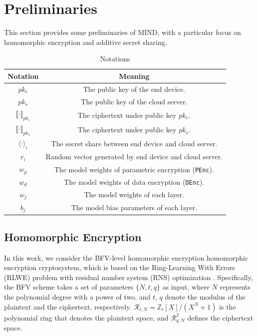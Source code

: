 ﻿\documentclass[conference]{IEEEtran}
\newcommand{\DEnc}{\texttt{DEnc}}
\newcommand{\PEnc}{\texttt{PEnc}}
\providecommand{\DIFaddend}{} %
\DeclareRobustCommand{\DIFaddend}{\DIFOaddend \let\includegraphics\DIFOincludegraphics} %
\begin{document}
\DIFaddend \section{Preliminaries}
This section provides some preliminaries of MIND, with a particular focus on homomorphic encryption and additive secret sharing.
\begin{table}[h]
\centering
\caption{Notations}
\label{table:notations}
\begin{tabular}{cc}
\toprule
\textbf{Notation} & \textbf{Meaning} \\ \midrule
$pk_e$                                   & The public key of the end device. \\
$pk_s$                                   & The public key of the cloud server. \\
$\llbracket \cdot \rrbracket_{pk_e}$     & The ciphertext under public key $pk_e$. \\
$\llbracket \cdot \rrbracket_{pk_s}$     & The ciphertext under public key $pk_s$. \\
$\langle \cdot \rangle_i$                & The secret share between end device and cloud server. \\
$r_i$                                    & Random vector generated by end device and cloud server. \\
$w_p$                                    & The model weights of parametric encryption (\PEnc).\\
$w_d$                                    & The model weights of data encryption (\DEnc).\\
$w_j$                                      & The model weights of each layer. \\
$b_j$                                      & The model bias parameters of each layer. \\

\bottomrule
\end{tabular}
\end{table}

\subsection{Homomorphic Encryption}\label{HE}
In this work, we consider the BFV-level homomorphic encryption homomorphic encryption cryptosystem, which is based on the Ring-Learning With Errors (RLWE) problem with residual number system (RNS) optimization \cite{bajard2016full}. Specifically, the BFV scheme takes a set of parameters $\{N, t, q\}$ as input, where $N$ represents the polynomial degree with a power of two, and $t$, $q$ denote the modulus of the plaintext and the ciphertext, respectively. $\mathcal{R}_{t,N} = \mathbb{Z}_t [X]/(X^N + 1)$ is the polynomial ring that denotes the plaintext space, and $\mathcal{R}_{q, N}^2$ defines the ciphertext space.
\end{document}
